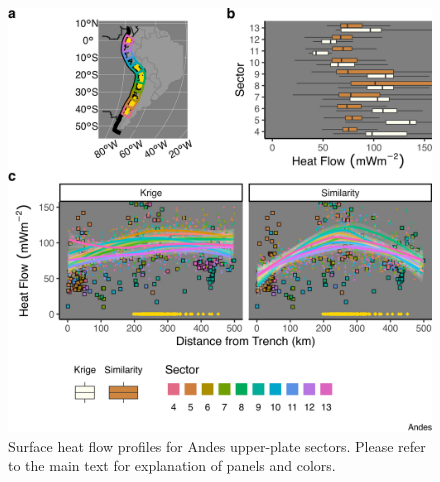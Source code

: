 \begin{figure}[htbp]

{\centering \includegraphics[width=1\linewidth,]{assets/figs/chpt3/AndesUpperPlate} 

}

\caption[Surface heat flow profiles for Andes upper-plate sectors]{Surface heat flow profiles for Andes upper-plate sectors. Please refer to the main text for explanation of panels and colors.}\label{fig:andesUpper}
\end{figure}

